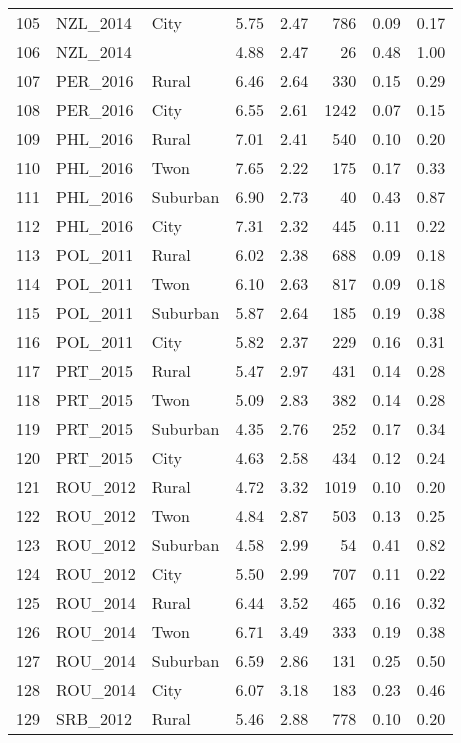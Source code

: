 \documentclass[12pt, titlepage]{article}
\begin{document}
\begin{longtable}[H]{rllrrrrr}
		105 & NZL\_2014 & City & 5.75 & 2.47 & 786 & 0.09 & 0.17 \\ 
		106 & NZL\_2014 &  & 4.88 & 2.47 &  26 & 0.48 & 1.00 \\ 
		107 & PER\_2016 & Rural & 6.46 & 2.64 & 330 & 0.15 & 0.29 \\ 
		108 & PER\_2016 & City & 6.55 & 2.61 & 1242 & 0.07 & 0.15 \\ 
		109 & PHL\_2016 & Rural & 7.01 & 2.41 & 540 & 0.10 & 0.20 \\ 
		110 & PHL\_2016 & Twon & 7.65 & 2.22 & 175 & 0.17 & 0.33 \\ 
		111 & PHL\_2016 & Suburban & 6.90 & 2.73 &  40 & 0.43 & 0.87 \\ 
		112 & PHL\_2016 & City & 7.31 & 2.32 & 445 & 0.11 & 0.22 \\ 
		113 & POL\_2011 & Rural & 6.02 & 2.38 & 688 & 0.09 & 0.18 \\ 
		114 & POL\_2011 & Twon & 6.10 & 2.63 & 817 & 0.09 & 0.18 \\ 
		115 & POL\_2011 & Suburban & 5.87 & 2.64 & 185 & 0.19 & 0.38 \\ 
		116 & POL\_2011 & City & 5.82 & 2.37 & 229 & 0.16 & 0.31 \\ 
		117 & PRT\_2015 & Rural & 5.47 & 2.97 & 431 & 0.14 & 0.28 \\ 
		118 & PRT\_2015 & Twon & 5.09 & 2.83 & 382 & 0.14 & 0.28 \\ 
		119 & PRT\_2015 & Suburban & 4.35 & 2.76 & 252 & 0.17 & 0.34 \\ 
		120 & PRT\_2015 & City & 4.63 & 2.58 & 434 & 0.12 & 0.24 \\ 
		121 & ROU\_2012 & Rural & 4.72 & 3.32 & 1019 & 0.10 & 0.20 \\ 
		122 & ROU\_2012 & Twon & 4.84 & 2.87 & 503 & 0.13 & 0.25 \\ 
		123 & ROU\_2012 & Suburban & 4.58 & 2.99 &  54 & 0.41 & 0.82 \\ 
		124 & ROU\_2012 & City & 5.50 & 2.99 & 707 & 0.11 & 0.22 \\ 
		125 & ROU\_2014 & Rural & 6.44 & 3.52 & 465 & 0.16 & 0.32 \\ 
		126 & ROU\_2014 & Twon & 6.71 & 3.49 & 333 & 0.19 & 0.38 \\ 
		127 & ROU\_2014 & Suburban & 6.59 & 2.86 & 131 & 0.25 & 0.50 \\ 
		128 & ROU\_2014 & City & 6.07 & 3.18 & 183 & 0.23 & 0.46 \\ 
		129 & SRB\_2012 & Rural & 5.46 & 2.88 & 778 & 0.10 & 0.20 \\ 

\end{longtable}
\end{document}
